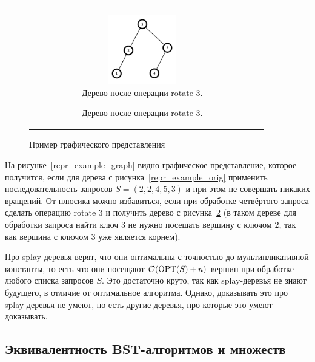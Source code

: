 \begin{figure}
\begin{tabular}{cc}
\begin{subfigure}{0.4\textwidth}
			\begin{subfigure}{0.4\textwidth}
				\includegraphics[height=3cm]{img/tree_rebuild.png}
				\caption{Дерево после операции \textrm{rotate 3}.}
				\label{repr_example_rebuild}
			\end{subfigure}
		\end{subfigure}

		\\
	\end{tabular}
	\caption{Пример графического представления}
	\label{repr_example}
\end{figure}

На рисунке~\ref{repr_example_graph} видно графическое представление, которое получится,
если для дерева с рисунка~\ref{repr_example_orig}
применить последовательность запросов $S = (2, 2, 4, 5, 3)$ и при этом не совершать
никаких вращений. От плюсика можно избавиться, если
при обработке четвёртого запроса сделать операцию \textrm{rotate 3} и получить дерево с рисунка~\ref{repr_example_rebuild} (в таком дереве для обработки запроса \textrm{найти ключ 3} не нужно посещать вершину с ключом $2$, так как вершина с ключом $3$ уже является корнем).

Про splay-деревья верят, что они оптимальны с точностью до мультипликативной константы,
то есть что они посещают $\mathcal{O}(\operatorname{OPT}(S) + n)$ вершин при обработке любого списка запросов $S$.
Это достаточно круто, так как splay-деревья не знают будущего,
в отличие от оптимальное алгоритма. Однако, доказывать это про splay-деревья не умеют,
но есть другие деревья, про которые это умеют доказывать.



\subsection{Эквивалентность BST-алгоритмов и \arbs множеств}

